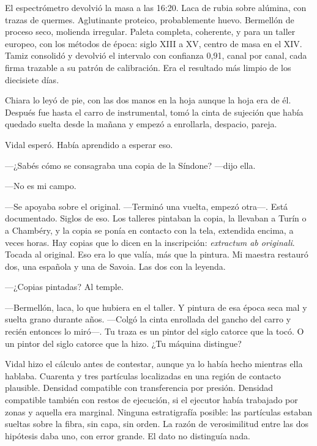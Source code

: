 \scenebreak


El espectrómetro devolvió la masa a las 16:20. Laca de rubia sobre alúmina, con trazas de quermes. Aglutinante proteico, probablemente huevo. Bermellón de proceso seco, molienda irregular. Paleta completa, coherente, y para un taller europeo, con los métodos de época: siglo XIII a XV, centro de masa en el XIV. Tamiz consolidó y devolvió el intervalo con confianza 0,91, canal por canal, cada firma trazable a su patrón de calibración. Era el resultado más limpio de los diecisiete días.

Chiara lo leyó de pie, con las dos manos en la hoja aunque la hoja era de él. Después fue hasta el carro de instrumental, tomó la cinta de sujeción que había quedado suelta desde la mañana y empezó a enrollarla, despacio, pareja.

Vidal esperó. Había aprendido a esperar eso.

---¿Sabés cómo se consagraba una copia de la Síndone? ---dijo ella.

---No es mi campo.

---Se apoyaba sobre el original. ---Terminó una vuelta, empezó otra---. Está documentado. Siglos de eso. Los talleres pintaban la copia, la llevaban a Turín o a Chambéry, y la copia se ponía en contacto con la tela, extendida encima, a veces horas. Hay copias que lo dicen en la inscripción: \textit{extractum ab originali}. Tocada al original. Eso era lo que valía, más que la pintura. Mi maestra restauró dos, una española y una de Savoia. Las dos con la leyenda.

---¿Copias pintadas? Al temple.

---Bermellón, laca, lo que hubiera en el taller. Y pintura de esa época seca mal y suelta grano durante años. ---Colgó la cinta enrollada del gancho del carro y recién entonces lo miró---. Tu traza es un pintor del siglo catorce que la tocó. O un pintor del siglo catorce que la hizo. ¿Tu máquina distingue?

Vidal hizo el cálculo antes de contestar, aunque ya lo había hecho mientras ella hablaba. Cuarenta y tres partículas localizadas en una región de contacto plausible. Densidad compatible con transferencia por presión. Densidad compatible también con restos de ejecución, si el ejecutor había trabajado por zonas y aquella era marginal. Ninguna estratigrafía posible: las partículas estaban sueltas sobre la fibra, sin capa, sin orden. La razón de verosimilitud entre las dos hipótesis daba uno, con error grande. El dato no distinguía nada.

